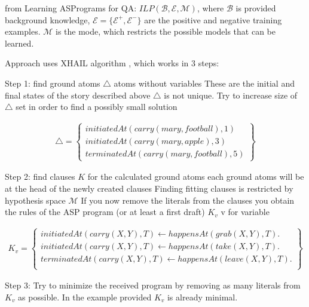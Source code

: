 from Learning ASPrograms for QA: 
    $ILP(\mathcal{B},\mathcal{E},\mathcal{M})$, where $\mathcal{B}$ is provided background knowledge, $\mathcal{E} = \{\mathcal{E}^+, \mathcal{E}^-\}$ are the positive and negative training examples. $\mathcal{M}$ is the mode, which restricts the possible models that can be learned. 


    Approach uses XHAIL algorithm \cite{citation_needed}, which works in 3 steps: 
    
    Step 1: 
        find ground atoms $\triangle$
        atoms without variables
        These are the initial and final states of the story described above
        $\triangle$ is not unique.
        Try to increase size of $\triangle$ set in order to find a possibly small solution
        
    \begin{align*}
        \triangle = 
        \left\{ 
        \begin{matrix}{initiatedAt(carry(mary, football), 1)} \\ 
        {initiatedAt(carry(mary, apple), 3)} \\ 
        {terminatedAt(carry(mary, football), 5)} 
        \end{matrix}\right\}
    \end{align*}
        
    Step 2: 
        find clauses $K$ for the calculated ground atoms
        each ground atoms will be at the head of the newly created clauses
        Finding fitting clauses is restricted by hypothesis space $\mathcal{M}$
        If you now remove the literals from the clauses you obtain the rules of the ASP program (or at least a first draft) $K_v$ v for variable
        
        
        
        \begin{align*}
        K_v = 
        \left\{ 
        \begin{matrix}{initiatedAt(carry(X, Y ), T)}
{\leftarrow happensAt(grab(X, Y ), T).}\\
{initiatedAt(carry(X, Y ), T)}
{\leftarrow happensAt(take(X, Y ), T).}\\
{terminatedAt(carry(X, Y ), T)}
{\leftarrow happensAt(leave(X, Y ), T).}\\
        \end{matrix}\right\}
    \end{align*}
        


    Step 3:
        Try to minimize the received program by removing as many literals from $K_v$ as possible. In the example provided $K_v$ is already minimal.     
        

